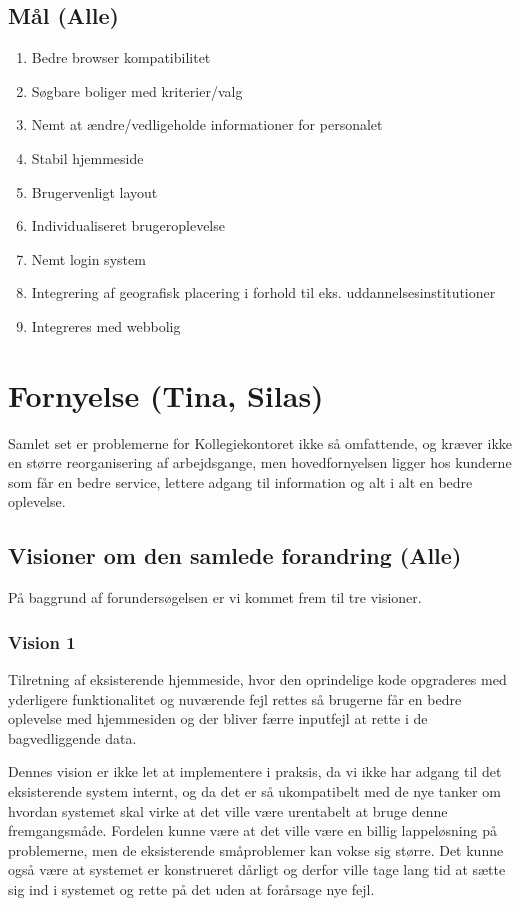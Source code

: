 \documentclass[12pt, a4paper]{report}
\begin{document}
\FloatBarrier
\subsection{Mål (Alle)}
\begin{enumerate}
\item Bedre browser kompatibilitet
\item Søgbare boliger med kriterier/valg
\item Nemt at ændre/vedligeholde informationer for personalet
\item Stabil hjemmeside
\item Brugervenligt layout
\item Individualiseret brugeroplevelse
\item Nemt login system
\item Integrering af geografisk placering i forhold til eks. uddannelsesinstitutioner
\item Integreres med webbolig
\end{enumerate}

\section{Fornyelse (Tina, Silas)}
Samlet set er problemerne for Kollegiekontoret ikke så omfattende, og kræver ikke en større reorganisering af arbejdsgange, men hovedfornyelsen ligger hos kunderne som får en bedre service, lettere adgang til information og alt i alt en bedre oplevelse.

\subsection{Visioner om den samlede forandring (Alle)}
På baggrund af forundersøgelsen er vi kommet frem til tre visioner.

\subsubsection{Vision 1}
Tilretning af eksisterende hjemmeside, hvor den oprindelige kode opgraderes med yderligere funktionalitet og nuværende fejl rettes så brugerne får en bedre oplevelse med hjemmesiden og der bliver færre inputfejl at rette i de bagvedliggende data.

Dennes vision er ikke let at implementere i praksis, da vi ikke har adgang til det eksisterende system internt, og da det er så ukompatibelt med de nye tanker om hvordan systemet skal virke at det ville være urentabelt at bruge denne fremgangsmåde. Fordelen kunne være at det ville være en billig lappeløsning på problemerne, men de eksisterende småproblemer kan vokse sig større. Det kunne også være at systemet er konstrueret dårligt og derfor ville tage lang tid at sætte sig ind i systemet og rette på det uden at forårsage nye fejl.
\end{document}
